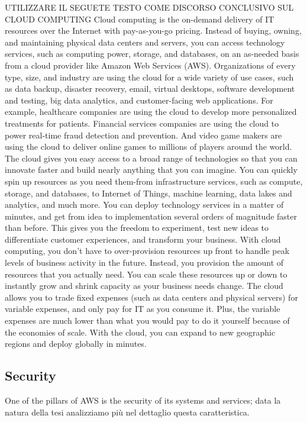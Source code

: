 UTILIZZARE IL SEGUETE TESTO COME DISCORSO CONCLUSIVO SUL CLOUD COMPUTING
Cloud computing is the on-demand delivery of IT resources over the Internet with pay-as-you-go pricing. Instead of buying, owning, and maintaining physical data centers and servers, you can access technology services, such as computing power, storage, and databases, on an as-needed basis from a cloud provider like Amazon Web Services (AWS). Organizations of every type, size, and industry are using the cloud for a wide variety of use cases, such as data backup, disaster recovery, email, virtual desktops, software development and testing, big data analytics, and customer-facing web applications. For example, healthcare companies are using the cloud to develop more personalized treatments for patients. Financial services companies are using the cloud to power real-time fraud detection and prevention. And video game makers are using the cloud to deliver online games to millions of players around the world. 
The cloud gives you easy access to a broad range of technologies so that you can innovate faster and build nearly anything that you can imagine. You can quickly spin up resources as you need them-from infrastructure services, such as compute, storage, and databases, to Internet of Things, machine learning, data lakes and analytics, and much more. You can deploy technology services in a matter of minutes, and get from idea to implementation several orders of magnitude faster than before. This gives you the freedom to experiment, test new ideas to differentiate customer experiences, and transform your business.
With cloud computing, you don't have to over-provision resources up front to handle peak levels of business activity in the future. Instead, you provision the amount of resources that you actually need. You can scale these resources up or down to instantly grow and shrink capacity as your business needs change.
The cloud allows you to trade fixed expenses (such as data centers and physical servers) for variable expenses, and only pay for IT as you consume it. Plus, the variable expenses are much lower than what you would pay to do it yourself because of the economies of scale. 
With the cloud, you can expand to new geographic regions and deploy globally in minutes.


\subsection{Security}
One of the pillars of AWS is the security of its systems and services; data la natura della tesi analizziamo più nel dettaglio questa caratteristica.

